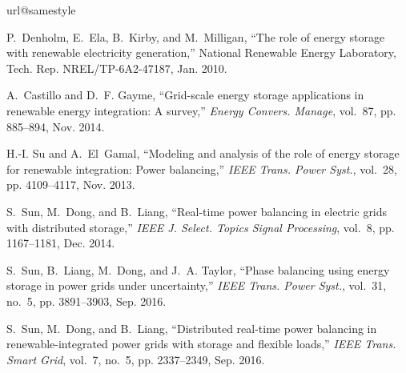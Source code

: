 \documentclass[journal]{IEEEtran}
\begin{document}
%
%
\begin{thebibliography}{10}
\providecommand{\url}[1]{#1}
\csname url@samestyle\endcsname
\providecommand{\newblock}{\relax}
\providecommand{\bibinfo}[2]{#2}
\providecommand{\BIBentrySTDinterwordspacing}{\spaceskip=0pt\relax}
\providecommand{\BIBentryALTinterwordstretchfactor}{4}
\providecommand{\BIBentryALTinterwordspacing}{\spaceskip=\fontdimen2\font plus
\BIBentryALTinterwordstretchfactor\fontdimen3\font minus
  \fontdimen4\font\relax}
\providecommand{\BIBforeignlanguage}[2]{{%
\expandafter\ifx\csname l@#1\endcsname\relax
\typeout{** WARNING: IEEEtran.bst: No hyphenation pattern has been}%
\typeout{** loaded for the language `#1'. Using the pattern for}%
\typeout{** the default language instead.}%
\else
\language=\csname l@#1\endcsname
\fi
#2}}
\providecommand{\BIBdecl}{\relax}
\BIBdecl

P.~Denholm, E.~Ela, B.~Kirby, and M.~Milligan, ``The role of energy storage
  with renewable electricity generation,'' National Renewable Energy
  Laboratory, Tech. Rep. NREL/TP-6A2-47187, Jan. 2010.

A.~Castillo and D.~F. Gayme, ``Grid-scale energy storage applications in
  renewable energy integration: A survey,'' \emph{Energy Convers. Manage},
  vol.~87, pp. 885--894, Nov. 2014.

H.-I. Su and A.~El~Gamal, ``Modeling and analysis of the role of energy storage
  for renewable integration: Power balancing,'' \emph{IEEE Trans. Power Syst.},
  vol.~28, pp. 4109--4117, Nov. 2013.

S.~Sun, M.~Dong, and B.~Liang, ``Real-time power balancing in electric grids
  with distributed storage,'' \emph{IEEE J. Select. Topics Signal Processing},
  vol.~8, pp. 1167--1181, Dec. 2014.

S.~Sun, B.~Liang, M.~Dong, and J.~A. Taylor, ``Phase balancing using energy
  storage in power grids under uncertainty,'' \emph{{IEEE} Trans. Power Syst.},
  vol.~31, no.~5, pp. 3891--3903, Sep. 2016.

S.~Sun, M.~Dong, and B.~Liang, ``Distributed real-time power balancing in
  renewable-integrated power grids with storage and flexible loads,''
  \emph{{IEEE} Trans. Smart Grid}, vol.~7, no.~5, pp. 2337--2349, Sep. 2016.


\end{thebibliography}
\end{document}
